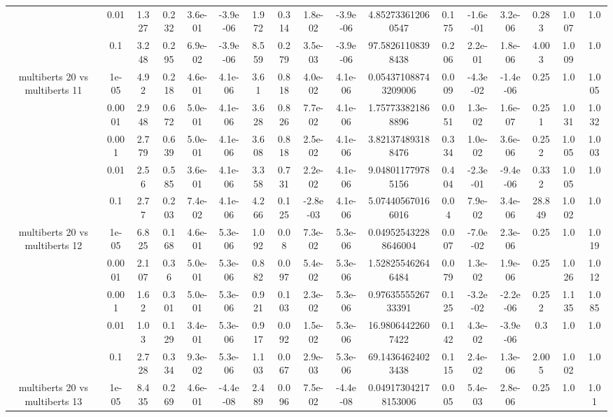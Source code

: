 \begin{tabular}{|c|c|c|c|c|c|c|c|c|c|c|c|c|c|c|c|c|}
 & 0.01 & 1.327 & 0.232 & 3.6e-01 & -3.9e-06 & 1.972 & 0.314 & 1.8e-02 & -3.9e-06 & 4.852733612060547 & 0.175 & -1.6e-01 & 3.2e-06 & 0.283 & 1.007 & 1.0 \\
 & 0.1 & 3.248 & 0.295 & 6.9e-02 & -3.9e-06 & 8.559 & 0.279 & 3.5e-03 & -3.9e-06 & 97.58261108398438 & 0.206 & 2.2e-01 & 1.8e-06 & 4.003 & 1.009 & 1.0 \\
\hline
\multirow{5}{*}{multiberts 20 vs multiberts 11} & 1e-05 & 4.92 & 0.218 & 4.6e-01 & 4.1e-06 & 3.61 & 0.818 & 4.0e-02 & 4.1e-06 & 0.054371088743209006 & 0.009 & -4.3e-02 & -1.4e-06 & 0.25 & 1.0 & 1.005 \\
 & 0.0001 & 2.948 & 0.672 & 5.0e-01 & 4.1e-06 & 3.628 & 0.826 & 7.7e-02 & 4.1e-06 & 1.757733821868896 & 0.051 & 1.3e-02 & 1.6e-07 & 0.251 & 1.031 & 1.032 \\
 & 0.001 & 2.779 & 0.639 & 5.0e-01 & 4.1e-06 & 3.608 & 0.818 & 2.5e-02 & 4.1e-06 & 3.821374893188476 & 0.334 & 1.0e-02 & 3.6e-06 & 0.252 & 1.005 & 1.003 \\
 & 0.01 & 2.56 & 0.585 & 3.6e-01 & 4.1e-06 & 3.358 & 0.731 & 2.2e-02 & 4.1e-06 & 9.048011779785156 & 0.404 & -2.3e-01 & -9.4e-06 & 0.332 & 1.005 & 1.0 \\
 & 0.1 & 2.77 & 0.203 & 7.4e-02 & 4.1e-06 & 4.266 & 0.125 & -2.8e-03 & 4.1e-06 & 5.074405670166016 & 0.04 & 7.9e-02 & 3.4e-06 & 28.849 & 1.002 & 1.0 \\
\hline
\multirow{5}{*}{multiberts 20 vs multiberts 12} & 1e-05 & 6.825 & 0.168 & 4.6e-01 & 5.3e-06 & 1.092 & 0.08 & 7.3e-02 & 5.3e-06 & 0.049525432288646004 & 0.007 & -7.0e-02 & 2.3e-06 & 0.25 & 1.0 & 1.019 \\
 & 0.0001 & 2.107 & 0.36 & 5.0e-01 & 5.3e-06 & 0.882 & 0.097 & 5.4e-02 & 5.3e-06 & 1.528255462646484 & 0.079 & 1.3e-02 & 1.9e-06 & 0.25 & 1.026 & 1.012 \\
 & 0.001 & 1.62 & 0.301 & 5.0e-01 & 5.3e-06 & 0.921 & 0.103 & 2.3e-02 & 5.3e-06 & 0.9763555526733391 & 0.125 & -3.2e-02 & -2.2e-06 & 0.252 & 1.135 & 1.085 \\
 & 0.01 & 1.03 & 0.129 & 3.4e-01 & 5.3e-06 & 0.917 & 0.092 & 1.5e-02 & 5.3e-06 & 16.98064422607422 & 0.142 & 4.3e-02 & -3.9e-06 & 0.3 & 1.0 & 1.0 \\
 & 0.1 & 2.728 & 0.334 & 9.3e-02 & 5.3e-06 & 1.103 & 0.067 & 2.9e-03 & 5.3e-06 & 69.14364624023438 & 0.115 & 2.4e-02 & 1.3e-06 & 2.005 & 1.002 & 1.0 \\
\hline
\multirow{5}{*}{multiberts 20 vs multiberts 13} & 1e-05 & 8.435 & 0.269 & 4.6e-01 & -4.4e-08 & 2.489 & 0.096 & 7.5e-02 & -4.4e-08 & 0.049173042178153006 & 0.005 & 5.4e-03 & 2.8e-06 & 0.25 & 1.0 & 1.01 \\

\end{tabular}
